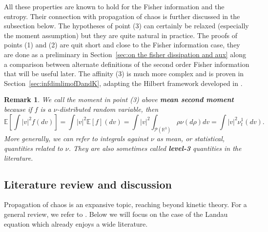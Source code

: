\documentclass[11pt,a4paper]{article}
\theoremstyle{definition}
\theoremstyle{plain}
\newtheorem{remark}[defi]{Remark}
\begin{document}
All these properties are known to hold for the Fisher information and the entropy. Their connection with propagation of chaos is further discussed in the subsection below. The hypotheses of point (3) can certainly be relaxed (especially the moment assumption) but they are quite natural in practice. The proofs of points (1) and (2) are quit short and close to the Fisher information case, they are done as a preliminary in Section~\ref{sec:on the fisher dissipation and aux} along a comparison between alternate definitions of the second order Fisher information that will be useful later. The affinity (3) is much more complex and is proven in Section~\ref{sec:infdimlimofDandK}, adapting the Hilbert framework developed in \cite{Rougerie2020}.
\begin{remark}
\label{rem:lvl3energy}
    We call the moment in point (3) above \textbf{mean second moment} because if $f$ is a $\nu$-distributed random variable, then
    $$\mathbb{E}\left[\int \vert v \vert^2 f(dv)\right]=\int \vert v \vert^2 \mathbb{E}[f](dv)=\int \vert v \vert^2 \int_{\mathcal{P}(\mathbb{R}^3)} \rho \nu(d\rho) dv=\int \vert v \vert^2 \nu^1_t (dv).$$
    More generally, we can refer to integrals against $\nu$ as mean, or statistical, quantities related to $\nu$. They are also sometimes called \textbf{level-3} quantities in the literature.
\end{remark}

\subsection{Literature review and discussion}

Propagation of chaos is an expansive topic, reaching beyond kinetic theory. For a general review, we refer to \cite{ChaintronDiez2022a, ChaintronDiez2022, HaurayMischler2012, Sznitman1991}. Below we will focus on the case of the Landau equation which already enjoys a wide literature.
\\
\end{document}
